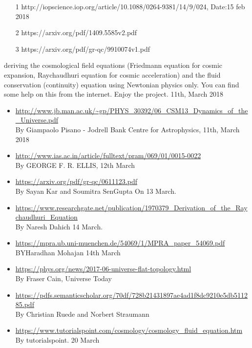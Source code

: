 \documentclass[10pt,a4paper]{article}
\begin{document}
\begin{itemize}
\item[1] http://iopscience.iop.org/article/10.1088/0264-9381/14/9/024, Date:15 feb 2018\\
\item[2] https://arxiv.org/pdf/1409.5585v2.pdf\\
\item[3] https://arxiv.org/pdf/gr-qc/9910074v1.pdf
\end{itemize}
deriving the cosmological field equations (Friedmann equation for cosmic expansion, Raychaudhuri equation for cosmic acceleration) and the fluid conservation (continuity) equation using Newtonian physics only. You can find some help on this from the internet.
Enjoy the project.
11th, March 2018\\
\begin{itemize}
\item \url{http://www.jb.man.ac.uk/~gp/PHYS_30392/06_CSM13_Dynamics_of_the_Universe.pdf}\\
By Giampaolo Pisano - Jodrell Bank Centre for Astrophysics, 11th, March 2018\\
\item \url{http://www.ias.ac.in/article/fulltext/pram/069/01/0015-0022}\\
By GEORGE F. R. ELLIS, 12th March
\item 
\url{https://arxiv.org/pdf/gr-qc/0611123.pdf}\\
By Sayan Kar and Soumitra SenGupta On 13 March.
\item
\url{https://www.researchgate.net/publication/1970379_Derivation_of_the_Raychaudhuri_Equation}
\\
By Naresh Dahich 14 March.
\item
\url{https://mpra.ub.uni-muenchen.de/54069/1/MPRA_paper_54069.pdf}\\

BYHaradhan Mohajan 14th March

\item \url{https://phys.org/news/2017-06-universe-flat-topology.html} \\
By  Fraser Cain, Universe Today
\item
\url{https://pdfs.semanticscholar.org/70df/728b21431897ae4ad1f8dc9210e5db511285.pdf}
\\
By Christian Ruede and Norbert Straumann
\item
\url{https://www.tutorialspoint.com/cosmology/cosmology_fluid_equation.htm}\\
By tutorialspoint. 20 March


\end{itemize}
\end{document}
